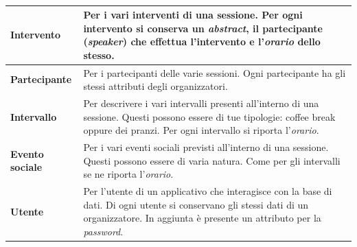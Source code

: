 \begin{table}[h!]
\begin{tabularx}{\textwidth}{|l|X|}
\textbf{Intervento} & Per i vari interventi di una sessione. Per ogni intervento si conserva un \textit{abstract}, il partecipante (\textit{speaker}) che effettua l'intervento e l'\textit{orario} dello stesso. \\ \hline
\textbf{Partecipante} & Per i partecipanti delle varie sessioni. Ogni partecipante ha gli stessi attributi degli organizzatori. \\ \hline
\textbf{Intervallo} & Per descrivere i vari intervalli presenti all'interno di una sessione. Questi possono essere di tue tipologie: coffee break oppure dei pranzi. Per ogni intervallo si riporta l'\textit{orario}. \\ \hline
\textbf{Evento sociale} & Per i vari eventi sociali previsti all'interno di una sessione. Questi possono essere di varia natura. Come per gli intervalli se ne riporta l'\textit{orario}. \\ \hline
\textbf{Utente} & Per l'utente di un applicativo che interagisce con la base di dati. Di ogni utente si conservano gli stessi dati di un organizzatore. In aggiunta è presente un attributo per la \textit{password}. \\
\hline
\end{tabularx}
\caption{}\label{tab:entities}
\end{table}
\newpage
